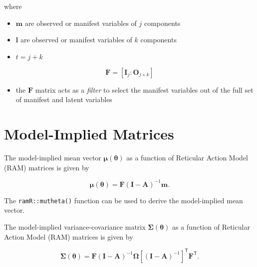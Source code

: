\documentclass[
]{book}
\providecommand{\tightlist}{%
  \setlength{\itemsep}{0pt}\setlength{\parskip}{0pt}}
\begin{document}
\noindent where

\begin{itemize}
\tightlist
\item
  \(\mathbf{m}\) are observed or manifest variables of \(j\) components
\item
  \(\mathbf{l}\) are observed or manifest variables of \(k\) components
\item
  \(t = j + k\)
\end{itemize}

\begin{equation}
  \mathbf{F}
  =
  \left[
    \mathbf{I}_{j} \colon \mathbf{O}_{j \times k}
  \right]
\end{equation}

\begin{itemize}
\tightlist
\item
  the \(\mathbf{F}\) matrix acts as a \emph{filter} to select the manifest variables
  out of the full set of manifest and latent variables
\end{itemize}

\hypertarget{model-implied-matrices}{%
\section{Model-Implied Matrices}\label{model-implied-matrices}}

The model-implied mean vector
\(\boldsymbol{\mu} \left( \boldsymbol{\theta} \right)\)
as a function of Reticular Action Model (RAM) matrices
is given by

\begin{equation}
  \boldsymbol{\mu} \left( \boldsymbol{\theta} \right)
  =
  \mathbf{F}
  \left( \mathbf{I} - \mathbf{A} \right)^{-1}
  \mathbf{m} .
\end{equation}

\noindent The \texttt{ramR::mutheta()} function can be used
to derive the model-implied mean vector.

The model-implied variance-covariance matrix
\(\boldsymbol{\Sigma} \left( \boldsymbol{\theta} \right)\)
as a function of Reticular Action Model (RAM) matrices
is given by

\begin{equation}
  \boldsymbol{\Sigma} \left( \boldsymbol{\theta} \right)
  =
  \mathbf{F}
  \left( \mathbf{I} - \mathbf{A} \right)^{-1}
  \boldsymbol{\Omega}
  \left[ \left( \mathbf{I} - \mathbf{A} \right)^{-1} \right]^{\mathsf{T}}
  \mathbf{F}^{\mathsf{T}} .
\end{equation}
\end{document}
